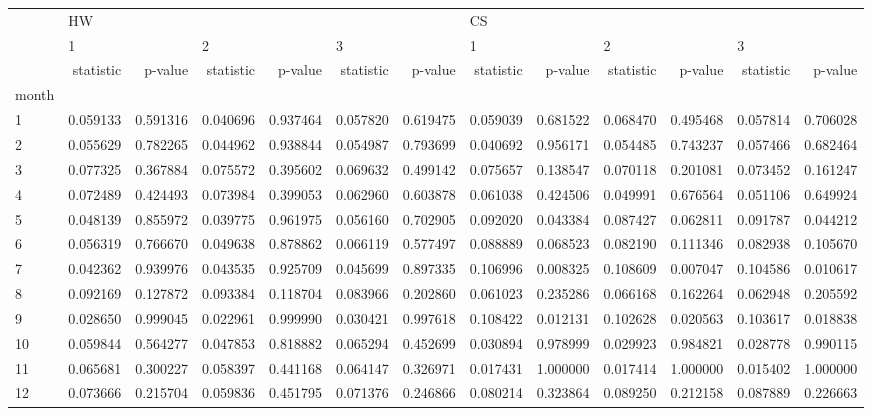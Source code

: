 \begin{tabular}{lrrrrrrrrrrrr}
\toprule
{} & \multicolumn{6}{l}{HW} & \multicolumn{6}{l}{CS} \\
{} & \multicolumn{2}{l}{1} & \multicolumn{2}{l}{2} & \multicolumn{2}{l}{3} & \multicolumn{2}{l}{1} & \multicolumn{2}{l}{2} & \multicolumn{2}{l}{3} \\
{} & statistic &   p-value & statistic &   p-value & statistic &   p-value & statistic &   p-value & statistic &   p-value & statistic &   p-value \\
month &           &           &           &           &           &           &           &           &           &           &           &           \\
\midrule
1     &  0.059133 &  0.591316 &  0.040696 &  0.937464 &  0.057820 &  0.619475 &  0.059039 &  0.681522 &  0.068470 &  0.495468 &  0.057814 &  0.706028 \\
2     &  0.055629 &  0.782265 &  0.044962 &  0.938844 &  0.054987 &  0.793699 &  0.040692 &  0.956171 &  0.054485 &  0.743237 &  0.057466 &  0.682464 \\
3     &  0.077325 &  0.367884 &  0.075572 &  0.395602 &  0.069632 &  0.499142 &  0.075657 &  0.138547 &  0.070118 &  0.201081 &  0.073452 &  0.161247 \\
4     &  0.072489 &  0.424493 &  0.073984 &  0.399053 &  0.062960 &  0.603878 &  0.061038 &  0.424506 &  0.049991 &  0.676564 &  0.051106 &  0.649924 \\
5     &  0.048139 &  0.855972 &  0.039775 &  0.961975 &  0.056160 &  0.702905 &  0.092020 &  0.043384 &  0.087427 &  0.062811 &  0.091787 &  0.044212 \\
6     &  0.056319 &  0.766670 &  0.049638 &  0.878862 &  0.066119 &  0.577497 &  0.088889 &  0.068523 &  0.082190 &  0.111346 &  0.082938 &  0.105670 \\
7     &  0.042362 &  0.939976 &  0.043535 &  0.925709 &  0.045699 &  0.897335 &  0.106996 &  0.008325 &  0.108609 &  0.007047 &  0.104586 &  0.010617 \\
8     &  0.092169 &  0.127872 &  0.093384 &  0.118704 &  0.083966 &  0.202860 &  0.061023 &  0.235286 &  0.066168 &  0.162264 &  0.062948 &  0.205592 \\
9     &  0.028650 &  0.999045 &  0.022961 &  0.999990 &  0.030421 &  0.997618 &  0.108422 &  0.012131 &  0.102628 &  0.020563 &  0.103617 &  0.018838 \\
10    &  0.059844 &  0.564277 &  0.047853 &  0.818882 &  0.065294 &  0.452699 &  0.030894 &  0.978999 &  0.029923 &  0.984821 &  0.028778 &  0.990115 \\
11    &  0.065681 &  0.300227 &  0.058397 &  0.441168 &  0.064147 &  0.326971 &  0.017431 &  1.000000 &  0.017414 &  1.000000 &  0.015402 &  1.000000 \\
12    &  0.073666 &  0.215704 &  0.059836 &  0.451795 &  0.071376 &  0.246866 &  0.080214 &  0.323864 &  0.089250 &  0.212158 &  0.087889 &  0.226663 \\
\bottomrule
\end{tabular}
